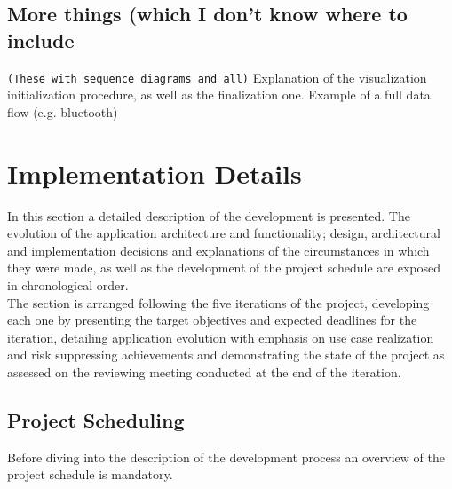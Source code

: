 		\subsection{More things (which I don't know where to include}
			
			\texttt{(These with sequence diagrams and all)}
			Explanation of the visualization initialization procedure, as well as the finalization one.
			Example of a full data flow (e.g. bluetooth)

	\section{Implementation Details}

		In this section a detailed description of the development is presented. The evolution of the application architecture and functionality; design, architectural and implementation decisions and explanations of the circumstances in which they were made, as well as the development of the project schedule are exposed in chronological order.\\

		The section is arranged following the five iterations of the project, developing each one by presenting the target objectives and expected deadlines for the iteration, detailing application evolution with emphasis on use case realization and risk suppressing achievements and demonstrating the state of the project as assessed on the reviewing meeting conducted at the end of the iteration.

		\subsection{Project Scheduling}
			
			Before diving into the description of the development process an overview of the project schedule %
			is mandatory.\\

